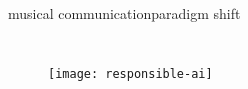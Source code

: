 \begin{frame}{musical communication}{paradigm shift}
\begin{columns}
        \begin{figure}%
            \texttt{[image: responsible-ai]}%
        \end{figure}
    \end{columns}
\end{frame}
